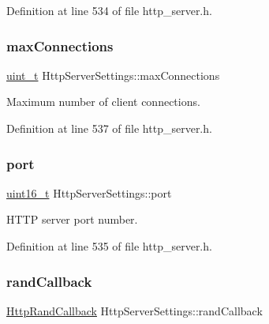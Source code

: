 Definition at line 534 of file http\+\_\+server.\+h.

\mbox{\label{structHttpServerSettings_a156347727039cb538dc3c2d966517590}} 
\subsubsection{\texorpdfstring{max\+Connections}{maxConnections}}
{\footnotesize\ttfamily \hyperlink{compiler__port_8h_a12a1e9b3ce141648783a82445d02b58d}{uint\+\_\+t} Http\+Server\+Settings\+::max\+Connections}



Maximum number of client connections. 



Definition at line 537 of file http\+\_\+server.\+h.

\mbox{\label{structHttpServerSettings_ac25483ccae9ee68803c66c74106b0488}} 
\subsubsection{\texorpdfstring{port}{port}}
{\footnotesize\ttfamily \hyperlink{stdint_8h_a273cf69d639a59973b6019625df33e30}{uint16\+\_\+t} Http\+Server\+Settings\+::port}



H\+T\+TP server port number. 



Definition at line 535 of file http\+\_\+server.\+h.

\mbox{\label{structHttpServerSettings_aeb1efb95fab8e249ead38a9123ae8277}} 
\subsubsection{\texorpdfstring{rand\+Callback}{randCallback}}
{\footnotesize\ttfamily \hyperlink{http__server_8h_a9f0f66dc24b0e7bc863c281081df3936}{Http\+Rand\+Callback} Http\+Server\+Settings\+::rand\+Callback}



